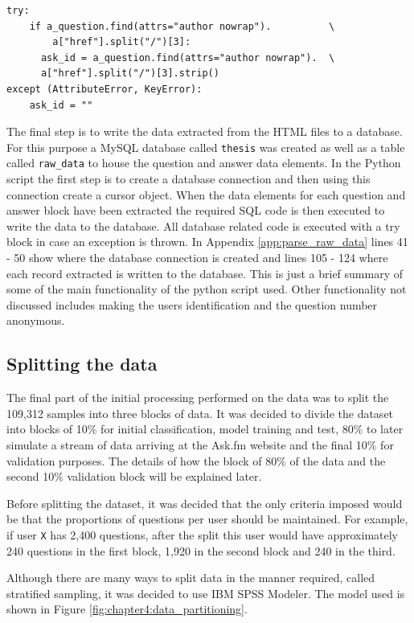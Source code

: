 \begin{lstlisting}[firstnumber=78]
try:
	if a_question.find(attrs="author nowrap").			\
	 	a["href"].split("/")[3]:
	  ask_id = a_question.find(attrs="author nowrap").	\
	  a["href"].split("/")[3].strip()
except (AttributeError, KeyError):
	ask_id = ""
\end{lstlisting}

The final step is to write the data extracted from the HTML files to a database. For this purpose a MySQL database called \verb|thesis| was created as well as a table called \verb|raw_data| to house the question and answer data elements. In the Python script the first step is to create a database connection and then using this connection create a cursor object. When the data elements for each question and answer block have been extracted the required SQL code is then executed to write the data to the database. All database related code is executed with a try block in case an exception is thrown. In Appendix \ref{app:parse_raw_data} lines 41 - 50 show where the database connection is created and lines 105 - 124 where each record extracted is written to the database. This is just a brief summary of some of the main functionality of the python script used. Other functionality not discussed includes making the users identification and the question number anonymous.

\subsection{Splitting the data}

The final part of the initial processing performed on the data was to split the 109,312 samples into three blocks of data. It was decided to divide the dataset into blocks of 10\% for initial classification, model training and test, 80\% to later simulate a stream of data arriving at the Ask.fm website and the final 10\% for validation purposes. The details of how the block of 80\% of the data and the second 10\% validation block will be explained later.

Before splitting the dataset, it was decided that the only criteria imposed would be that the proportions of questions per user should be maintained. For example, if user \verb|X| has 2,400 questions, after the split this user would have approximately 240 questions in the first block, 1,920 in the second block and 240 in the third. 

Although there are many ways to split data in the manner required, called stratified sampling, it was decided to use IBM SPSS Modeler. The model used is shown in Figure \ref{fig:chapter4:data_partitioning}.

